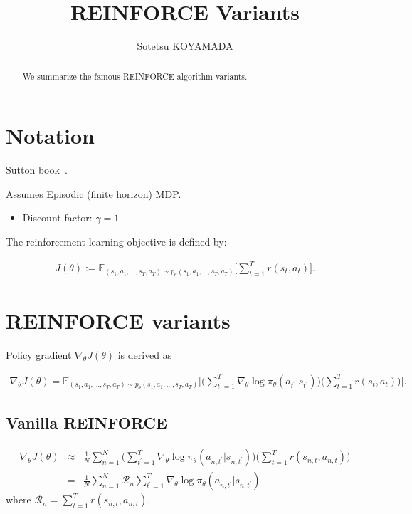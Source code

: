 \documentclass{article}
\title{REINFORCE Variants}
\author{
Sotetsu KOYAMADA
}
\begin{document}
\maketitle

\begin{abstract}
We summarize the famous REINFORCE algorithm variants.
\end{abstract}

\section{Notation}
Sutton book~\cite{Sutton2018-ij}.

Assumes Episodic (finite horizon) MDP.

\begin{itemize}
	\item Discount factor: $\gamma = 1$
\end{itemize}

The reinforcement learning objective is defined by:

\begin{eqnarray}
J(\theta) := \mathbb{E}_{(s_1, a_1, \ldots, s_T, a_T) \sim p_\theta(s_1, a_1, \ldots, s_T, a_T)} \biggl[ \sum_{t=1}^{T} r(s_t, a_t) \biggr].
\end{eqnarray}

\section{REINFORCE variants}

Policy gradient $\nabla_\theta J(\theta)$ is derived as

\begin{eqnarray}
\nabla_\theta J(\theta) 
= \mathbb{E}_{(s_1, a_1, \ldots, s_T, a_T) \sim p_\theta(s_1, a_1, \ldots, s_T, a_T)} \Biggl[ \Biggl(\sum_{t^\prime=1}^{T} \nabla_\theta \log \pi_\theta (a_{t^\prime}|s_{t^\prime}) \Biggr) \Biggl( \sum_{t=1}^T r(s_t, a_t) \Biggr) \Biggr].
\end{eqnarray}

\subsection{Vanilla REINFORCE}

\begin{eqnarray}
\nabla_\theta J(\theta) 
&\approx& \frac{1}{N} \sum_{n=1}^{N} \Biggl( \sum_{t^\prime=1}^{T} \nabla_\theta \log \pi_\theta (a_{n, t^\prime}|s_{n, t^\prime}) \Biggr) \Biggl( \sum_{t=1}^T r(s_{n, t}, a_{n, t}) \Biggr) \\
&=& \frac{1}{N} \sum_{n=1}^{N} \mathcal{R}_n \sum_{t^\prime=1}^{T} \nabla_\theta \log \pi_\theta (a_{n, t^\prime}|s_{n, t^\prime}) 
\end{eqnarray}
where $\mathcal{R}_{n} = \sum_{t=1}^T r(s_{n, t}, a_{n, t})$.
\end{document}
